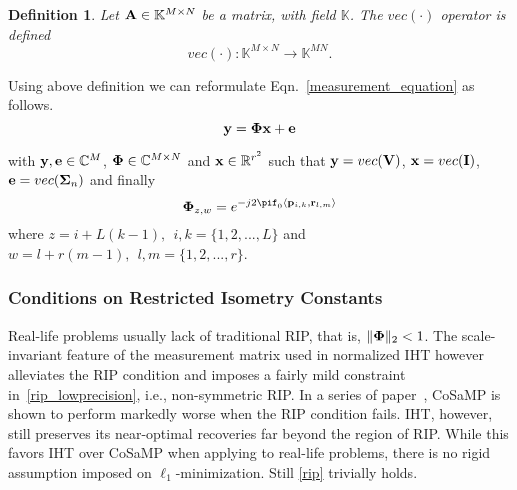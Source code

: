 \documentclass[article]{imsart}
\newtheorem{definition}{Definition}
\begin{document}
\begin{definition}
Let ${\bf A} \in \mathbb{K}^{M\times N}$ be a matrix, with field ${\mathbb{K}}$. The $vec(\cdot)$ operator is defined
\begin{equation*}
    {vec(\cdot)}: \mathbb{K}^{M\times N} \rightarrow \mathbb{K}^{MN}.
\end{equation*}
\end{definition}

Using above definition we can reformulate Eqn.~\ref{measurement_equation} as follows.
\begin{equation}
    {\bf y} = {\bf \Phi}{\bf x} + {\bf e}
\end{equation}

with ${\bf y}, {\bf e} \in \mathbb{C}^{M}$, ${\bf \Phi} \in \mathbb{C}^{M\times N}$ and ${\bf x} \in \mathbb{R}^{r^2}$ such that ${\bf y} = vec({\bf V})$, ${\bf x} = vec({\bf I})$, ${\bf e} = vec(\boldsymbol{\Sigma}_n)$ and finally
\begin{equation}
    {\bf \Phi}_{z,w} = e^{-j2\pif_0 \langle {\bf p}_{i, k}, {\bf r}_{l, m} \rangle } 
\end{equation}
where $z = i + L(k-1), \ \ i, k = \{1, 2, ..., L\}$ and $w = l + r(m-1), \ \ l, m = \{1, 2, ..., r\}$.

\subsubsection{Conditions on Restricted Isometry Constants}
Real-life problems usually lack of traditional RIP, that is, $\|{\bf \Phi}\|_2 < 1$. The scale-invariant feature of the measurement matrix used in normalized IHT however alleviates the RIP condition and imposes a fairly mild constraint in~\ref{rip_lowprecision}, i.e., non-symmetric RIP. In a series of paper~\cite{blumensath2010niht, blumensath2012greedy}, CoSaMP is shown to perform markedly worse when the RIP condition fails. IHT, however, still preserves its near-optimal recoveries far beyond the region of RIP. While this favors IHT over CoSaMP when applying to real-life problems, there is no rigid assumption imposed on $\ell_1$-minimization. Still \ref{rip} trivially holds.
\end{document}
